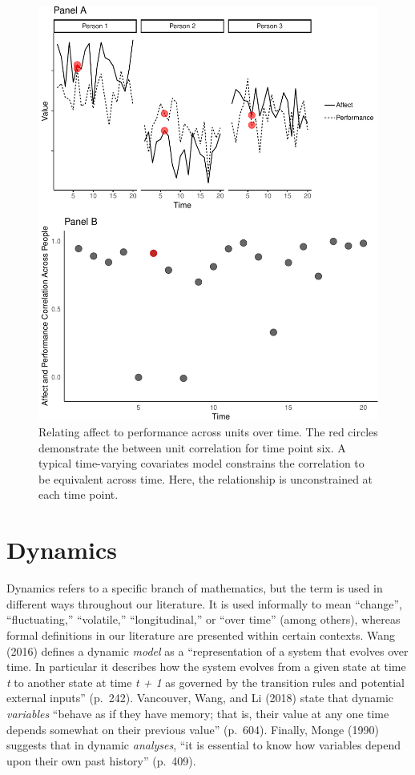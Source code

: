 \documentclass[english,,man]{apa6}
\theoremstyle{definition}
\theoremstyle{definition}
\theoremstyle{definition}
\theoremstyle{remark}
\begin{document}
\begin{figure}
\centering
\includegraphics{figures/unnamed-chunk-18-1.pdf}
\caption{\label{fig:unnamed-chunk-18}Relating affect to performance across
units over time. The red circles demonstrate the between unit
correlation for time point six. A typical time-varying covariates model
constrains the correlation to be equivalent across time. Here, the
relationship is unconstrained at each time point.\label{relation_tvc}}
\end{figure}

\hypertarget{dynamics}{%
\section{Dynamics}\label{dynamics}}

Dynamics refers to a specific branch of mathematics, but the term is
used in different ways throughout our literature. It is used informally
to mean \enquote{change}, \enquote{fluctuating,} \enquote{volatile,}
\enquote{longitudinal,} or \enquote{over time} (among others), whereas
formal definitions in our literature are presented within certain
contexts. Wang (2016) defines a dynamic \emph{model} as a
\enquote{representation of a system that evolves over time. In
particular it describes how the system evolves from a given state at
time \emph{t} to another state at time \emph{t + 1} as governed by the
transition rules and potential external inputs} (p.~242). Vancouver,
Wang, and Li (2018) state that dynamic \emph{variables} \enquote{behave
as if they have memory; that is, their value at any one time depends
somewhat on their previous value} (p.~604). Finally, Monge (1990)
suggests that in dynamic \emph{analyses}, \enquote{it is essential to
know how variables depend upon their own past history} (p.~409).
\end{document}
